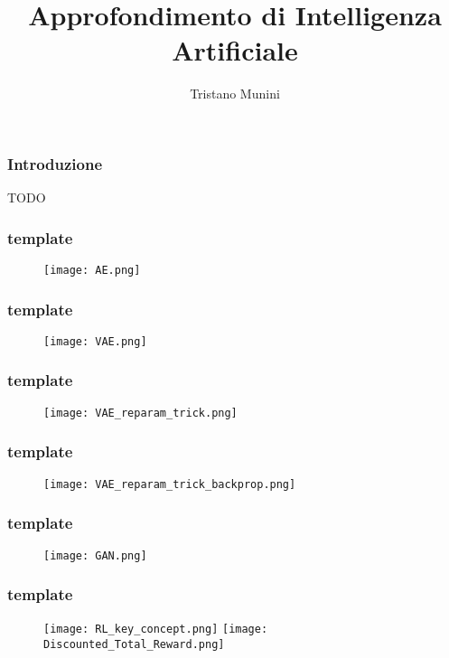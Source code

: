 \documentclass{beamer}
\title{Approfondimento di Intelligenza Artificiale}
\author{Tristano Munini}
\begin{document}
{
  \frame{\titlepage}
}

\begin{frame}
\frametitle{Introduzione}
TODO
\end{frame}


\begin{frame}
\frametitle{template}

\begin{figure}[ht]
  \texttt{[image: AE.png]}
\end{figure}

\end{frame}

\begin{frame}
\frametitle{template}
\begin{figure}[ht]
  \texttt{[image: VAE.png]}
\end{figure}
\end{frame}

\begin{frame}
\frametitle{template}
\begin{figure}[ht]
  \texttt{[image: VAE\_reparam\_trick.png]}
\end{figure}
\end{frame}

\begin{frame}
\frametitle{template}
\begin{figure}[ht]
  \texttt{[image: VAE\_reparam\_trick\_backprop.png]}
\end{figure}
\end{frame}


\begin{frame}
\frametitle{template}
\begin{figure}[ht]
  \texttt{[image: GAN.png]}
\end{figure}
\end{frame}

\begin{frame}
\frametitle{template}
\begin{figure}[ht]
  \texttt{[image: RL\_key\_concept.png]}
  \texttt{[image: Discounted\_Total\_Reward.png]}
\end{figure}
\end{frame}
\end{document}
